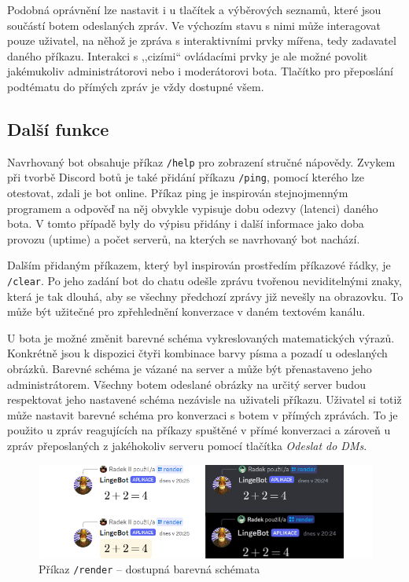 \documentclass[FM]{tulthesis}
\begin{document}
	Podobná oprávnění lze nastavit i u tlačítek a výběrových seznamů, které jsou součástí botem odeslaných zpráv. Ve výchozím stavu s nimi může interagovat pouze uživatel, na něhož je zpráva s interaktivními prvky mířena, tedy zadavatel daného příkazu. Interakci s ,,cizími`` ovládacími prvky je ale možné povolit jakémukoliv administrátorovi nebo i moderátorovi bota. Tlačítko pro přeposlání podtématu do přímých zpráv je vždy dostupné všem.
	
	\subsection{Další funkce} %
	
	Navrhovaný bot obsahuje příkaz \verb|/help| pro zobrazení stručné nápovědy. Zvykem při tvorbě Discord botů je také přidání příkazu \verb|/ping|, pomocí kterého lze otestovat, zdali je bot online. Příkaz ping je inspirován stejnojmenným programem a odpověď na něj obvykle vypisuje dobu odezvy (latenci) daného bota. V tomto případě byly do výpisu přidány i další informace jako doba provozu (uptime) a počet serverů, na kterých se navrhovaný bot nachází.
	
	Dalším přidaným příkazem, který byl inspirován prostředím příkazové řádky, je \verb|/clear|. Po jeho zadání bot do chatu odešle zprávu tvořenou neviditelnými znaky, která je tak dlouhá, aby se všechny předchozí zprávy již nevešly na obrazovku. To může být užitečné pro zpřehlednění konverzace v daném textovém kanálu.
	
	U bota je možné změnit barevné schéma vykreslovaných matematických výrazů. Konkrétně jsou k dispozici čtyři kombinace barvy písma a pozadí u odeslaných obrázků. Barevné schéma je vázané na server a může být přenastaveno jeho administrátorem. Všechny botem odeslané obrázky na určitý server budou respektovat jeho nastavené schéma nezávisle na uživateli příkazu. Uživatel si totiž může nastavit barevné schéma pro konverzaci s botem v přímých zprávách. To je použito u zpráv reagujících na příkazy spuštěné v přímé konverzaci a zároveň u zpráv přeposlaných z jakéhokoliv serveru pomocí tlačítka \textit{Odeslat do DMs}.
	
	\begin{figure}[ht]
		\centering
		\includegraphics[width=\textwidth]{img/5X/Themes}
		\caption{Příkaz \texttt{/render} – dostupná barevná schémata}
	\end{figure}
	
\end{document}
